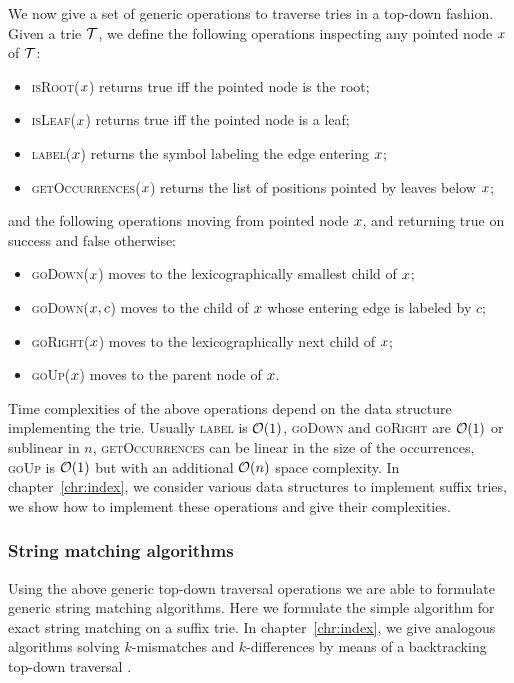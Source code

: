 We now give a set of generic operations to traverse tries in a top-down fashion.
Given a trie $\mathcal {T}$, we define the following operations inspecting any pointed node $x$ of $\mathcal {T}$:
\begin{itemize}
\item \textsc{isRoot}($x$) returns true iff the pointed node is the root;
\item \textsc{isLeaf}($x$) returns true iff the pointed node is a leaf;
\item \textsc{label}($x$) returns the symbol labeling the edge entering $x$;
\item \textsc{getOccurrences}($x$) returns the list of positions pointed by leaves below $x$;
\end{itemize}
and the following operations moving from pointed node $x$, and returning true on success and false otherwise:
\begin{itemize}
\item \textsc{goDown}($x$) moves to the lexicographically smallest child of $x$;
\item \textsc{goDown}($x, c$) moves to the child of $x$ whose entering edge is labeled by $c$;
\item \textsc{goRight}($x$) moves to the lexicographically next child of $x$;
\item \textsc{goUp}($x$) moves to the parent node of $x$.
\end{itemize}

Time complexities of the above operations depend on the data structure implementing the trie.
Usually \textsc{label} is $\mathcal{O}(1)$, \textsc{goDown} and \textsc{goRight} are $\mathcal{O}(1)$ or sublinear in $n$, \textsc{getOccurrences} can be linear in the size of the occurrences, \textsc{goUp} is $\mathcal{O}(1)$ but with an additional $\mathcal{O}(n)$ space complexity.
In chapter~\ref{chr:index}, we consider various data structures to implement suffix tries, we show how to implement these operations and give their complexities.

\subsubsection{String matching algorithms}

Using the above generic top-down traversal operations we are able to formulate generic string matching algorithms.
Here we formulate the simple algorithm for exact string matching on a suffix trie.
In chapter~\ref{chr:index}, we give analogous algorithms solving $k$-mismatches and $k$-differences by means of a backtracking top-down traversal \citep{Ukkonen1993, Baeza1999}.


